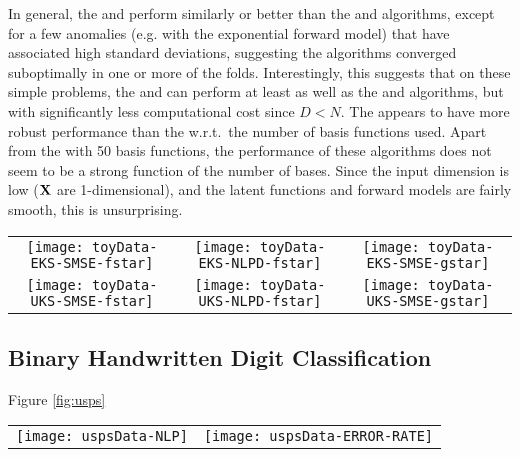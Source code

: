 In general, the \eks and \uks perform similarly or better than the \egp and
\ugp algorithms, except for a few anomalies (e.g. \egp with the exponential
forward model) that have associated high standard deviations, suggesting the
algorithms converged suboptimally in one or more of the folds. Interestingly,
this suggests that on these simple problems, the \eks and \uks can perform at
least as well as the \egp and \uks algorithms, but with significantly less
computational cost since $D < N$. The \eks appears to have more robust
performance than the \uks w.r.t.\ the number of basis functions used. Apart
from the \uks with 50 basis functions, the performance of these algorithms does
not seem to be a strong function of the number of bases. Since the input
dimension is low ($\mathbf{X}$ are 1-dimensional), and the latent functions and
forward models are fairly smooth, this is unsurprising.

\begin{figure*}
\centering
\begin{tabular}{c c c}
\texttt{[image: toyData-EKS-SMSE-fstar]} &
\texttt{[image: toyData-EKS-NLPD-fstar]} &
\texttt{[image: toyData-EKS-SMSE-gstar]} \\
\texttt{[image: toyData-UKS-SMSE-fstar]} &
\texttt{[image: toyData-UKS-NLPD-fstar]} &
\texttt{[image: toyData-UKS-SMSE-gstar]} \\
\end{tabular}
\caption{The performance of the \eks (top) and \uks (bottom)
on the synthetic inversion problems as a function of the number of features used. 
\label{fig:toyinversions}
}
\end{figure*}
%
\subsection{Binary Handwritten Digit Classification}
Figure \ref{fig:usps}

\begin{figure*}[h]
\centering
\begin{tabular}{c c}
\texttt{[image: uspsData-NLP]}  &
\texttt{[image: uspsData-ERROR-RATE]}  
\end{tabular}
\caption{The performance of the \eks and \uks (bottom) on the binary classification problem for the \usps dataset as a function of 
the number of  basis used. \egp and \ugp are the original (full) \gp models.
\label{fig:usps}
}
\end{figure*}
%
